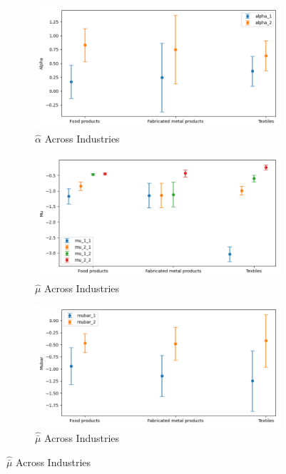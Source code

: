 \documentclass{article}
\begin{document}
\begin{figure}[ht!]
    \centering 
    \caption{I.I.D Mixture Model Across Industries}
    \begin{subfigure}[t]{0.32\textwidth}
        \centering
        \includegraphics[width=\textwidth]{figure/stationary_mixture_alpha_across_industries.png}
        \caption{$\hat\alpha$ Across Industries}
    \end{subfigure}
    \begin{subfigure}[t]{0.32\textwidth}
        \centering
        \includegraphics[width=\textwidth]{figure/stationary_mixture_mu_across_industries.png}
        \caption{$\hat\mu$ Across Industries}
    \end{subfigure}

    \begin{subfigure}[t]{0.32\textwidth}
        \centering
        \includegraphics[width=\textwidth]{figure/stationary_mixture_mubar_across_industries.png}
        \caption{$\hat{\bar\mu}$ Across Industries}


\end{subfigure}
\end{figure}
\end{document}
